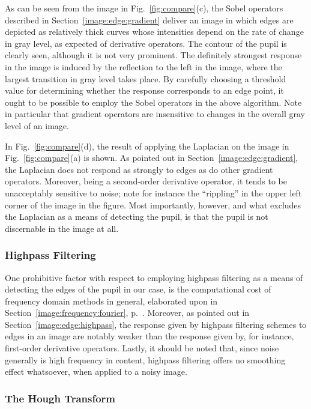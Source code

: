As can be seen from the image in Fig.~\ref{fig:compare}(c), the Sobel
operators described in Section~\ref{image:edge:gradient} deliver an
image in which edges are depicted as relatively thick curves whose
intensities depend on the rate of change in gray level, as expected of
derivative operators.  The contour of the pupil is clearly seen,
although it is not very prominent.  The definitely strongest response
in the image is induced by the reflection to the left in the image,
where the largest transition in gray level takes place.  By carefully
choosing a threshold value for determining whether the response
corresponds to an edge point, it ought to be possible to employ the
Sobel operators in the above algorithm.  Note in particular that
gradient operators are insensitive to changes in the overall gray
level of an image.

In Fig.~\ref{fig:compare}(d), the result of applying the Laplacian on
the image in Fig.~\ref{fig:compare}(a) is shown.  As pointed out in
Section~\ref{image:edge:gradient}, the Laplacian does not respond as
strongly to edges as do other gradient operators.  Moreover, being a
second-order derivative operator, it tends to be unacceptably
sensitive to noise; note for instance the ``rippling'' in the upper
left corner of the image in the figure.  Most importantly, however,
and what excludes the Laplacian as a means of detecting the pupil, is
that the pupil is not discernable in the image at all.

\subsubsection{Highpass Filtering}

One prohibitive factor with respect to employing highpass filtering as
a means of detecting the edges of the pupil in our case, is the
computational cost of frequency domain methods in general, elaborated
upon in Section~\ref{image:frequency:fourier}, p.~\pageref{pg:fft:O}.
Moreover, as pointed out in Section~\ref{image:edge:highpass}, the
response given by highpass filtering schemes to edges in an image are
notably weaker than the response given by, for instance, first-order
derivative operators.  Lastly, it should be noted that, since noise
generally is high frequency in content, highpass filtering offers no
smoothing effect whatsoever, when applied to a noisy image.

\subsubsection{The Hough Transform}

